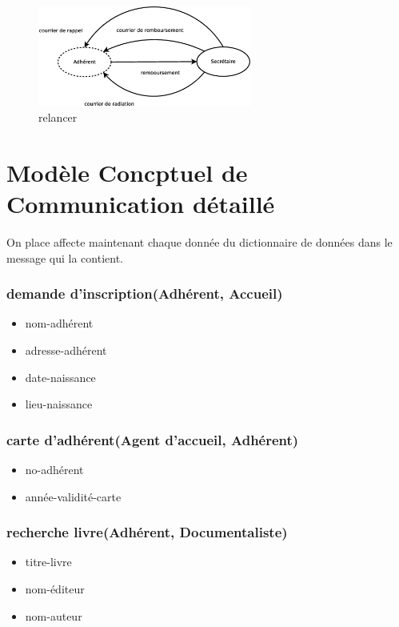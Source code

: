 \begin{figure}[!htb]
    \begin{center}
    \includegraphics[width=7cm]{images/cc1_mcc4.eps}
    \caption{\label{cc1_mcc4} relancer}
    \end{center}
\end{figure}

\newpage
\section*{Modèle Concptuel de Communication détaillé}

On place affecte maintenant chaque donnée du dictionnaire de données dans le message qui la contient.

\subsubsection*{demande d'inscription(Adhérent, Accueil)}
\begin{itemize}
    \item nom-adhérent
    \item adresse-adhérent
    \item date-naissance
    \item lieu-naissance
\end{itemize}

\subsubsection*{carte d'adhérent(Agent d'accueil, Adhérent)}
\begin{itemize}
    \item no-adhérent
    \item année-validité-carte
\end{itemize}

\subsubsection*{recherche livre(Adhérent, Documentaliste)}
\begin{itemize}
    \item titre-livre
    \item nom-éditeur
    \item nom-auteur
\end{itemize}

